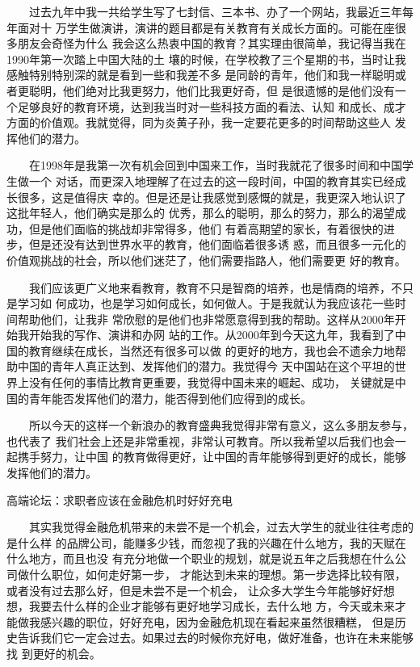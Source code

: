 \documentclass[11pt]{ctexart}
\begin{document}
{{{{　　过去九年中我一共给学生写了七封信、三本书、办了一个网站，我最近三年每年面对十
万学生做演讲，演讲的题目都是有关教育有关成长方面的。可能在座很多朋友会奇怪为什么
我会这么热衷中国的教育？其实理由很简单，我记得当我在1990年第一次踏上中国大陆的土
壤的时候，在学校教了三个星期的书，当时让我感触特别特别深的就是看到一些和我差不多
是同龄的青年，他们和我一样聪明或者更聪明，他们绝对比我更努力，他们比我更好奇，但
是很遗憾的是他们没有一个足够良好的教育环境，达到我当时对一些科技方面的看法、认知
和成长、成才方面的价值观。我就觉得，同为炎黄子孙，我一定要花更多的时间帮助这些人
发挥他们的潜力。


　　在1998年是我第一次有机会回到中国来工作，当时我就花了很多时间和中国学生做一个
对话，而更深入地理解了在过去的这一段时间，中国的教育其实已经成长很多，这是值得庆
幸的。但是还是让我感觉到感慨的就是，我更深入地认识了这批年轻人，他们确实是那么的
优秀，那么的聪明，那么的努力，那么的渴望成功，但是他们面临的挑战却非常得多，他们
有着高期望的家长，有着很快的进步，但是还没有达到世界水平的教育，他们面临着很多诱
惑，而且很多一元化的价值观挑战的社会，所以他们迷茫了，他们需要指路人，他们需要更
好的教育。


　　我们应该更广义地来看教育，教育不只是智商的培养，也是情商的培养，不只是学习如
何成功，也是学习如何成长，如何做人。于是我就认为我应该花一些时间帮助他们，让我非
常欣慰的是他们也非常愿意得到我的帮助。这样从2000年开始我开始我的写作、演讲和办网
站的工作。从2000年到今天这九年，我看到了中国的教育继续在成长，当然还有很多可以做
的更好的地方，我也会不遗余力地帮助中国的青年人真正达到、发挥他们的潜力。我觉得今
天中国站在这个平坦的世界上没有任何的事情比教育更重要，我觉得中国未来的崛起、成功，
关键就是中国的青年能否发挥他们的潜力，能否得到他们应得到的成长。


　　所以今天的这样一个新浪办的教育盛典我觉得非常有意义，这么多朋友参与，也代表了
我们社会上还是非常重视，非常认可教育。所以我希望以后我们也会一起携手努力，让中国
的教育做得更好，让中国的青年能够得到更好的成长，能够发挥他们的潜力。


高端论坛：求职者应该在金融危机时好好充电

　　其实我觉得金融危机带来的未尝不是一个机会，过去大学生的就业往往考虑的是什么样
的品牌公司，能赚多少钱，而忽视了我的兴趣在什么地方，我的天赋在什么地方，而且也没
有充分地做一个职业的规划，就是说五年之后我想在什么公司做什么职位，如何走好第一步，
才能达到未来的理想。第一步选择比较有限，或者没有过去那么好，但是未尝不是一个机会，
让众多大学生今年能够好好想想，我要去什么样的企业才能够有更好地学习成长，去什么地
方，今天或未来才能做我感兴趣的职位，好好充电，因为金融危机现在看起来虽然很糟糕，
但是历史告诉我们它一定会过去。如果过去的时候你充好电，做好准备，也许在未来能够找
到更好的机会。


}}}}
\end{document}
